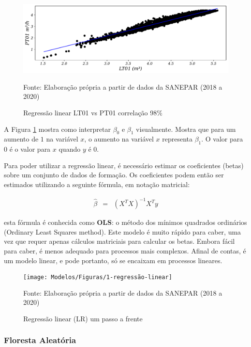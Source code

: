 \begin{figure}[H]
	\centering
	\caption{Regressão linear LT01 vs PT01 correlação 98\%}
	\label{fig:lr-lt01-m3}
	\includegraphics[width=1\linewidth]{"Modelos/Figuras/LR LT01 (m³)"}
	
	Fonte: Elaboração própria a partir de dados da SANEPAR (2018 a 2020)
\end{figure}



A Figura \ref{fig:lr-lt01-m3} mostra como interpretar $\beta_0$ e $\beta_1$ visualmente. Mostra que para um aumento de $1$ na variável $x$, o aumento na variável $x$ representa $\beta_1$. O valor para $0$ é o valor para $x$ quando $y$ é $0$.

Para poder utilizar a regressão linear, é necessário estimar os coeficientes (betas) sobre um conjunto de dados de formação. Os coeficientes podem então ser estimados utilizando a seguinte fórmula, em notação matricial:

\begin{eqnarray}
	\hat{\beta}&=&\left(X^T X\right)^{-1} X^T y\label{eq:ols}
\end{eqnarray}

 esta fórmula é conhecida como \textbf{OLS}: o método dos mínimos quadrados ordinários (Ordinary Least Squares method). Este modelo é muito rápido para caber, uma vez que requer apenas cálculos matriciais para calcular os betas. Embora fácil para caber, é menos adequado para processos mais complexos. Afinal de contas, é um modelo linear, e pode portanto, só se encaixam em processos lineares.

\begin{figure}[H]
	\centering
	\caption{Regressão linear (LR) um passo a frente}
	\label{fig:1-regressao-linear}
	\texttt{[image: Modelos/Figuras/1-regressão-linear]}
	
	Fonte: Elaboração própria a partir de dados da SANEPAR (2018 a 2020)
\end{figure}


\subsubsection{Floresta Aleat\'oria} \label{subsubsec:rf}

